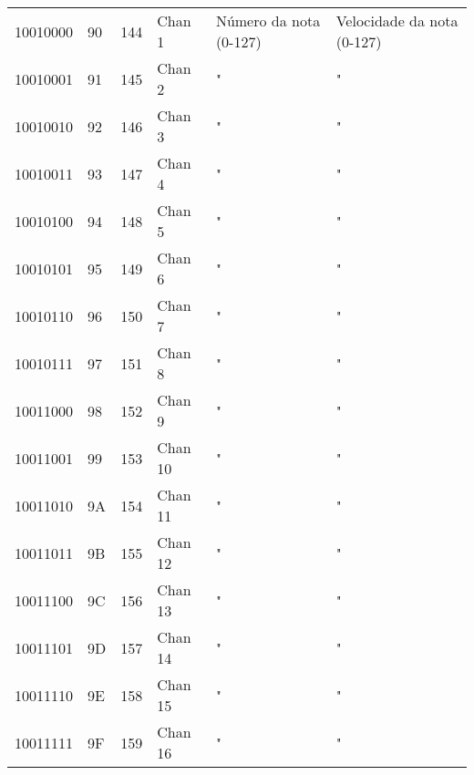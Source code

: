 \begin{center}
\begin{supertabular}{| C{2cm} | C{1.5cm} | C{1.5cm} | C{5.3cm} | C{1.5cm} | C{1.5cm} |}
             10010000 & 90 & 144 & Chan 1   &        Número da nota (0-127)          &          Velocidade da nota (0-127)        \\
                10010001 & 91 & 145 & Chan 2   &                   "                    &                    "                       \\
             10010010 & 92 & 146 & Chan 3   &                   "                    &                    "                       \\
                10010011 & 93 & 147 & Chan 4   &                   "                    &                    "                       \\
             10010100 & 94 & 148 & Chan 5   &                   "                    &                    "                       \\
                10010101 & 95 & 149 & Chan 6   &                   "                    &                    "                       \\
             10010110 & 96 & 150 & Chan 7   &                   "                    &                    "                       \\
                10010111 & 97 & 151 & Chan 8   &                   "                    &                    "                       \\
             10011000 & 98 & 152 & Chan 9   &                   "                    &                    "                       \\
                10011001 & 99 & 153 & Chan 10  &                   "                    &                    "                       \\
             10011010 & 9A & 154 & Chan 11  &                   "                    &                    "                       \\
                10011011 & 9B & 155 & Chan 12  &                   "                    &                    "                       \\
             10011100 & 9C & 156 & Chan 13  &                   "                    &                    "                       \\
                10011101 & 9D & 157 & Chan 14  &                   "                    &                    "                       \\
             10011110 & 9E & 158 & Chan 15  &                   "                    &                    "                       \\
                10011111 & 9F & 159 & Chan 16  &                   "                    &                    "                       \\
        \end{supertabular}
        \end{center}

